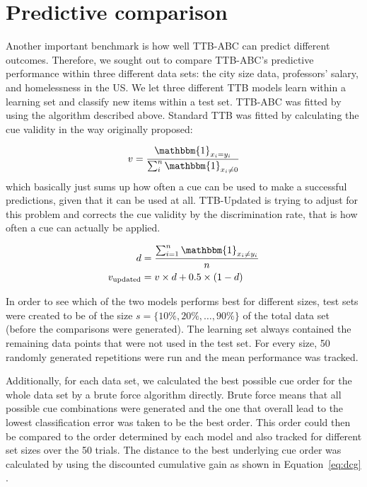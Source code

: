 \documentclass[a4paper,man, natbib]{apa6}
\begin{document}
\section{Predictive comparison}
Another important benchmark is how well TTB-ABC can predict different outcomes. Therefore, we sought out to compare TTB-ABC's predictive performance within three different data sets: the city size data, professors' salary, and homelessness in the US. We let three different TTB models learn within a learning set and classify new items within a test set.  TTB-ABC was fitted by using the algorithm described above. Standard TTB was fitted by calculating the cue validity in the way originally proposed:

\begin{align}
v=\frac{\mathbbm{1}_{x_i=y_i}}{\sum_i^n{\mathbbm{1}_{x_i\neq0}}}
\end{align}
which basically just sums up how often a cue can be used to make a successful predictions, given that it can be used at all. TTB-Updated is trying to adjust for this problem \cite{newell2004search} and corrects the cue validity by the discrimination rate, that is how often a cue can actually be applied.

\begin{align}
d&=\frac{\sum_{i=1}^{n}{\mathbbm{1}_{x_i \neq y_i}}}{n}\\
v_{\text{updated}}&=v \times d+0.5\times(1-d)
\end{align}

In order to see which of the two models performs best for different sizes, test sets were created to be of the size $s=\{10\%,20\%,\dots,90\%\}$ of the total data set (before the comparisons were generated). The learning set always contained the remaining data points that were not used in the test set. For every size, 50 randomly generated repetitions were run and the mean performance was tracked.  

Additionally, for each data set, we calculated the best possible cue order for the whole data set by a brute force algorithm directly. Brute force means that all possible cue combinations were generated and the one that overall lead to the lowest classification error was taken to be the best order. This order could then be compared to the order determined by each model and also tracked for different set sizes over the 50 trials. The distance to the best underlying cue order was calculated by using the discounted cumulative gain as shown in Equation~\ref{eq:dcg} \citep{netharecognizing}.
\end{document}
